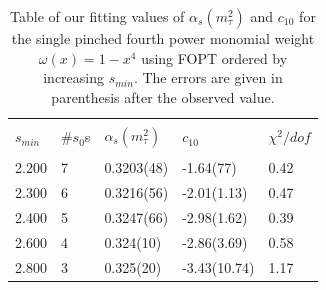 \documentclass[../../index.tex]{subfiles}
\begin{document}
\begin{table}
  \centering
  \begin{tabular}{lllll}
    \toprule \\
    $s_{min}$ & \#$s_0$s & $\alpha_s(m_\tau^2)$ & $c_{10}$ & $\chi^2/dof$  \\
    \hline \\
    2.200 & 7  & 0.3203(48) & -1.64(77) & 0.42 \\
    2.300 & 6  & 0.3216(56) & -2.01(1.13) & 0.47 \\
    2.400 & 5  & 0.3247(66) & -2.98(1.62) & 0.39 \\
    2.600 & 4  & 0.324(10) & -2.86(3.69) & 0.58 \\
    2.800 & 3  & 0.325(20) & -3.43(10.74) & 1.17 \\
    \bottomrule
  \end{tabular}
  \caption{Table of our fitting values of $\alpha_s(m_\tau^2)$ and $c_{10}$
    for the single pinched fourth power monomial weight $\omega(x)=1-x^4$ using FOPT ordered
    by increasing $s_{min}$. The errors are given in parenthesis after the observed value.}
  \label{table:fitM4AlD10}
\end{table}
\end{document}
